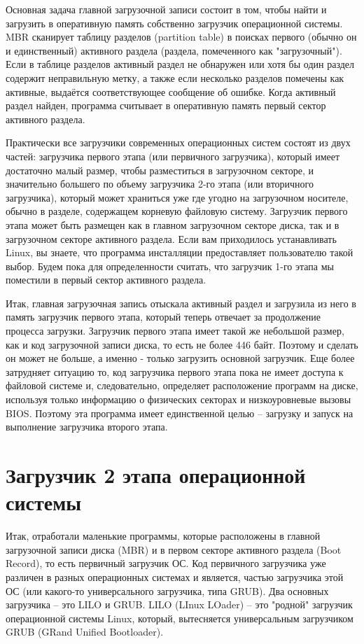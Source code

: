 Основная задача главной загрузочной записи состоит в том, чтобы найти и загрузить в оперативную память собственно загрузчик операционной системы. MBR сканирует таблицу разделов (partition table) в поисках первого (обычно он и единственный) активного раздела (раздела, помеченного как "загрузочный"). Если в таблице разделов активный раздел не обнаружен или хотя бы один раздел содержит неправильную метку, а также если несколько разделов помечены как активные, выдаётся соответствующее сообщение об ошибке. Когда активный раздел найден, программа считывает в оперативную память первый сектор активного раздела.

Практически все загрузчики современных операционных систем состоят из двух частей: загрузчика первого этапа (или первичного загрузчика), который имеет достаточно малый размер, чтобы разместиться в загрузочном секторе, и значительно большего по объему загрузчика 2-го этапа (или вторичного загрузчика), который может храниться уже где угодно на загрузочном носителе, обычно в разделе, содержащем корневую файловую систему. Загрузчик первого этапа может быть размещен как в главном загрузочном секторе диска, так и в загрузочном секторе активного раздела. Если вам приходилось устанавливать Linux, вы знаете, что программа инсталляции предоставляет пользователю такой выбор. Будем пока для определенности считать, что загрузчик 1-го этапа мы поместили в первый сектор активного раздела.

Итак, главная загрузочная запись отыскала активный раздел и загрузила из него в память загрузчик первого этапа, который теперь отвечает за продолжение процесса загрузки. Загрузчик первого этапа имеет такой же небольшой размер, как и код загрузочной записи диска, то есть не более 446 байт. Поэтому и сделать он может не больше, а именно - только загрузить основной загрузчик. Еще более затрудняет ситуацию то, код загрузчика первого этапа пока не имеет доступа к файловой системе и, следовательно, определяет расположение программ на диске, используя только информацию о физических секторах и низкоуровневые вызовы BIOS. Поэтому эта программа имеет единственной целью -- загрузку и запуск на выполнение загрузчика второго этапа.

\newpage
\section{Загрузчик 2 этапа операционной системы}

Итак, отработали маленькие программы, которые расположены в главной загрузочной записи диска (MBR) и в первом секторе активного раздела (Boot Record), то есть первичный загрузчик ОС. Код первичного загрузчика уже различен в разных операционных системах и является, частью загрузчика этой ОС (или какого-то универсального загрузчика, типа GRUB). Два основных загрузчика -- это LILO и GRUB. LILO (LInux LOader) -- это "родной" загрузчик операционной системы Linux, который, вытесняется универсальным загрузчиком GRUB (GRand Unified Bootloader).

